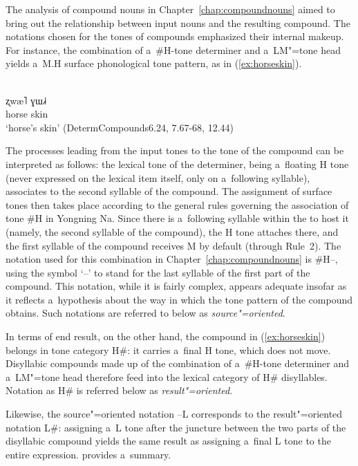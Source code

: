 The analysis of compound nouns in Chapter~\ref{chap:compoundnouns} aimed to bring out the relationship between input nouns
and the resulting compound. The notations chosen for the tones of compounds emphasized their internal
makeup. For instance, the combination of a~\#H-tone determiner and a~LM"=tone head yields a~M.H
surface phonological tone pattern, as in (\ref{ex:horseskin}).

\begin{exe}
	\ex
	\label{ex:horseskin}
	\\ 
		\gll ʐwæ˥		ɣɯ˩˧\\
		horse		skin\\
		\glt ‘horse’s skin’ (DetermCompounds6.24, 7.67-68, 12.44)
\end{exe}

The processes leading from the input tones to the tone of the compound can be interpreted as follows: the lexical tone of the determiner, being a~floating H tone (never expressed on the lexical item itself, only on a~following syllable), associates to the
second syllable of the compound. The assignment of surface
tones then takes place according to the general rules governing the association of tone \#H in
Yongning Na. Since there is a~following syllable within the  to host it (namely, the
second syllable of the compound), the H tone attaches there, and the first syllable of the compound
receives M by default (through Rule~2). The notation used for this combination in Chapter~\ref{chap:compoundnouns} is \#H--, using the symbol
‘--' to stand for the last syllable of the first part of the compound. This notation, while it is
fairly complex, appears adequate insofar as it reflects a~hypothesis about the way in which the
tone pattern of the compound obtains. Such notations are referred to below as \textit{source"=oriented}.

In terms of end result, on the other hand, the compound in (\ref{ex:horseskin}) belongs in tone category H\#: it
carries a~final H tone, which does not move. Disyllabic compounds made up of the combination of a~\#H-tone
determiner and a~LM"=tone head therefore feed into the lexical category of H\# disyllables. Notation
as H\# is referred below as \textit{result"=oriented}.

Likewise, the source"=oriented notation --L corresponds to the
result"=oriented notation L\#: assigning a~L tone after the juncture between the two parts of the disyllabic compound yields the same result as assigning a~final L tone to the entire
expression. 
provides a~summary.

